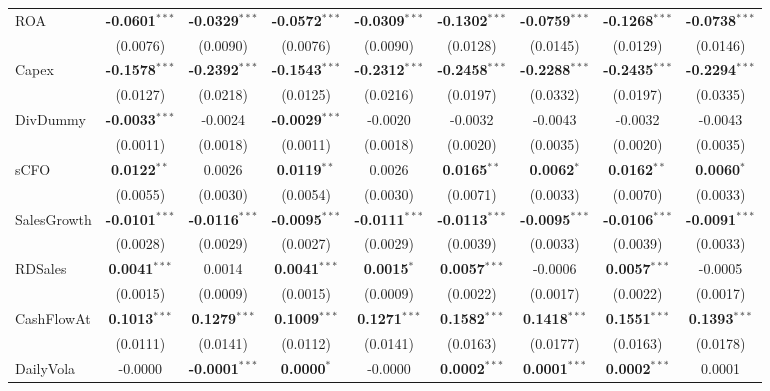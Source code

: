 \documentclass[11pt,a4paper]{article}
\begin{document}
\begin{table}[htbp]
\begin{tabular}{lcccccccc}
ROA & \textbf{-0.0601}$^{***}$ & \textbf{-0.0329}$^{***}$ & \textbf{-0.0572}$^{***}$ & \textbf{-0.0309}$^{***}$ & \textbf{-0.1302}$^{***}$ & \textbf{-0.0759}$^{***}$ & \textbf{-0.1268}$^{***}$ & \textbf{-0.0738}$^{***}$ \\
 & (0.0076) & (0.0090) & (0.0076) & (0.0090) & (0.0128) & (0.0145) & (0.0129) & (0.0146) \\
Capex & \textbf{-0.1578}$^{***}$ & \textbf{-0.2392}$^{***}$ & \textbf{-0.1543}$^{***}$ & \textbf{-0.2312}$^{***}$ & \textbf{-0.2458}$^{***}$ & \textbf{-0.2288}$^{***}$ & \textbf{-0.2435}$^{***}$ & \textbf{-0.2294}$^{***}$ \\
 & (0.0127) & (0.0218) & (0.0125) & (0.0216) & (0.0197) & (0.0332) & (0.0197) & (0.0335) \\
DivDummy & \textbf{-0.0033}$^{***}$ & -0.0024 & \textbf{-0.0029}$^{***}$ & -0.0020 & -0.0032 & -0.0043 & -0.0032 & -0.0043 \\
 & (0.0011) & (0.0018) & (0.0011) & (0.0018) & (0.0020) & (0.0035) & (0.0020) & (0.0035) \\
sCFO & \textbf{0.0122}$^{**}$ & 0.0026 & \textbf{0.0119}$^{**}$ & 0.0026 & \textbf{0.0165}$^{**}$ & \textbf{0.0062}$^{*}$ & \textbf{0.0162}$^{**}$ & \textbf{0.0060}$^{*}$ \\
 & (0.0055) & (0.0030) & (0.0054) & (0.0030) & (0.0071) & (0.0033) & (0.0070) & (0.0033) \\
SalesGrowth & \textbf{-0.0101}$^{***}$ & \textbf{-0.0116}$^{***}$ & \textbf{-0.0095}$^{***}$ & \textbf{-0.0111}$^{***}$ & \textbf{-0.0113}$^{***}$ & \textbf{-0.0095}$^{***}$ & \textbf{-0.0106}$^{***}$ & \textbf{-0.0091}$^{***}$ \\
 & (0.0028) & (0.0029) & (0.0027) & (0.0029) & (0.0039) & (0.0033) & (0.0039) & (0.0033) \\
RDSales & \textbf{0.0041}$^{***}$ & 0.0014 & \textbf{0.0041}$^{***}$ & \textbf{0.0015}$^{*}$ & \textbf{0.0057}$^{***}$ & -0.0006 & \textbf{0.0057}$^{***}$ & -0.0005 \\
 & (0.0015) & (0.0009) & (0.0015) & (0.0009) & (0.0022) & (0.0017) & (0.0022) & (0.0017) \\
CashFlowAt & \textbf{0.1013}$^{***}$ & \textbf{0.1279}$^{***}$ & \textbf{0.1009}$^{***}$ & \textbf{0.1271}$^{***}$ & \textbf{0.1582}$^{***}$ & \textbf{0.1418}$^{***}$ & \textbf{0.1551}$^{***}$ & \textbf{0.1393}$^{***}$ \\
 & (0.0111) & (0.0141) & (0.0112) & (0.0141) & (0.0163) & (0.0177) & (0.0163) & (0.0178) \\
DailyVola & -0.0000 & \textbf{-0.0001}$^{***}$ & \textbf{0.0000}$^{*}$ & -0.0000 & \textbf{0.0002}$^{***}$ & \textbf{0.0001}$^{***}$ & \textbf{0.0002}$^{***}$ & 0.0001 \\

\end{tabular}
\end{table}
\end{document}
